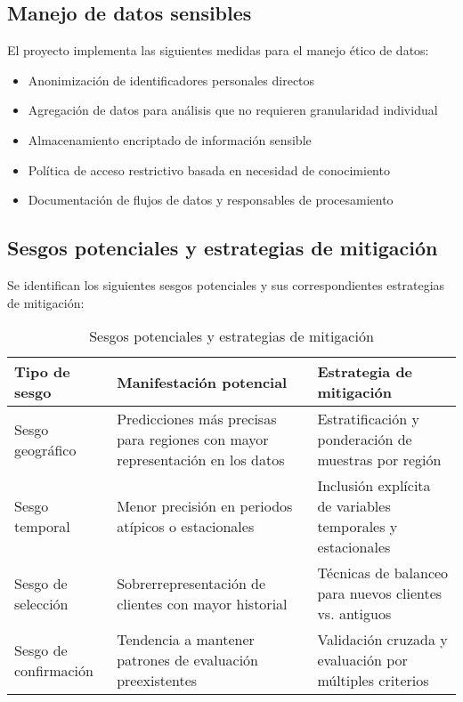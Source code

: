 \subsection{Manejo de datos sensibles}
El proyecto implementa las siguientes medidas para el manejo ético de datos:

\begin{itemize}
    \item Anonimización de identificadores personales directos
    \item Agregación de datos para análisis que no requieren granularidad individual
    \item Almacenamiento encriptado de información sensible
    \item Política de acceso restrictivo basada en necesidad de conocimiento
    \item Documentación de flujos de datos y responsables de procesamiento
\end{itemize}

\subsection{Sesgos potenciales y estrategias de mitigación}
Se identifican los siguientes sesgos potenciales y sus correspondientes estrategias de mitigación:

\begin{table}[ht]
\centering
\begin{tabular}{|p{4cm}|p{5cm}|p{5cm}|}
\hline
\textbf{Tipo de sesgo} & \textbf{Manifestación potencial} & \textbf{Estrategia de mitigación} \\
\hline
Sesgo geográfico & Predicciones más precisas para regiones con mayor representación en los datos & Estratificación y ponderación de muestras por región \\
\hline
Sesgo temporal & Menor precisión en periodos atípicos o estacionales & Inclusión explícita de variables temporales y estacionales \\
\hline
Sesgo de selección & Sobrerrepresentación de clientes con mayor historial & Técnicas de balanceo para nuevos clientes vs. antiguos \\
\hline
Sesgo de confirmación & Tendencia a mantener patrones de evaluación preexistentes & Validación cruzada y evaluación por múltiples criterios \\
\hline
\end{tabular}
\caption{Sesgos potenciales y estrategias de mitigación}
\end{table}

